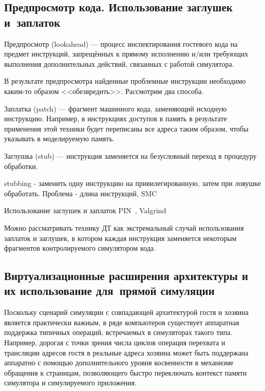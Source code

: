 \subsection[Предпросмотр кода]{Предпросмотр кода. Использование заглушек и~заплаток}

Предпросмотр (\abbr lookahead) --- процесс инспектирования гостевого кода на предмет инструкций, запрещённых к прямому исполнению и/или требующих выполнения дополнительных действий, связанных с работой симулятора.

В результате предпросмотра найденные проблемные инструкции необходимо каким-то образом <<обезвредить>>. Рассмотрим два способа.

\begin{itemize*}
\item Заплатка (\abbr patch) --- фрагмент машинного кода, заменяющий исходную инструкцию. Например, в инструкциях доступов в память в результате применения этой техники будет переписаны все адреса таким образом, чтобы указывать в моделируемую память.
\item Заглушка (\abbr stub) --- инструкция заменяется на безусловный переход в процедуру обработки. \todo
\end{itemize*}

\todo stubbing - заменить одну инструкцию на привилегированную, затем при ловушке обработать. Проблема - длина инструкций, SMC

Использование заглушек и заплаток \todo PIN~\cite{pin}, Valgrind~\cite{valgrind} 

Можно рассматривать технику ДТ как экстремальный случай использования заплаток и заглушек, в котором каждая инструкция заменяется некоторым фрагментов контролируемого симулятором кода.

\subsection[Виртуализационные расширения]{Виртуализационные расширения архитектуры и их использование для~прямой симуляции}

Поскольку сценарий симуляции с совпадающей архитектурой гостя и хозяина является практически важным, в ряде компьютеров существует аппаратная поддержка типичных операций, встречаемых в симуляторах такого типа. Например, дорогая с точки зрения числа циклов операция перехвата и трансляции адресов гостя в реальные адреса хозяина может быть поддержана аппаратно с помощью дополнительного уровня косвенности в механизме обращения к страницам, позволяющего быстро переключать контекст памяти симулятора и симулируемого приложения.

